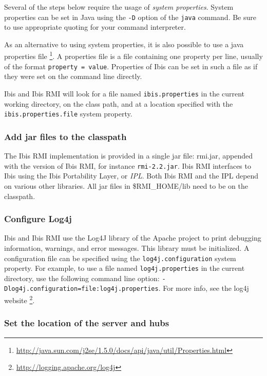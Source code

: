 \documentclass[a4paper,10pt]{article}
\begin{document}
Several of the steps below require the usage of \emph{system properties}.
System properties can be set in Java using the \texttt{-D} option of the
\texttt{java} command. Be sure to use appropriate quoting for your
command interpreter.

As an alternative to using system properties, it is also possible to use
a java properties file
\footnote{\url{http://java.sun.com/j2se/1.5.0/docs/api/java/util/Properties.html}}.
A properties file is a file containing one property per line, usually of
the format \texttt{property = value}. Properties of Ibis can be set in
such a file as if they were set on the command line directly.

Ibis and Ibis RMI will look for a file named \texttt{ibis.properties} in the
current working directory, on the class path, and at a location specified
with the \texttt{ibis.properties.file} system property.

\subsubsection{Add jar files to the classpath}

The Ibis RMI implementation is provided in a single jar file: rmi.jar,
appended with the version of Ibis RMI, for instance \texttt{rmi-2.2.jar}.
Ibis RMI interfaces to Ibis using the Ibis Portability Layer, or
\emph{IPL}. Both Ibis RMI and the IPL depend on various other libraries.
All jar files in \$RMI\_HOME/lib need to be on the classpath.

\subsubsection{Configure Log4j}

Ibis and Ibis RMI use the Log4J library of the Apache project to print debugging
information, warnings, and error messages. This library must be
initialized. A configuration file can be specified using the
\texttt{log4j.configuration} system property. For example, to use a file
named \texttt{log4j.properties} in the current directory, use the
following command line option:
\texttt{-Dlog4j.configuration=file:log4j.properties}. For more info,
see the log4j website \footnote{\url{http://logging.apache.org/log4j}}.

\subsubsection{Set the location of the server and hubs}
\end{document}

